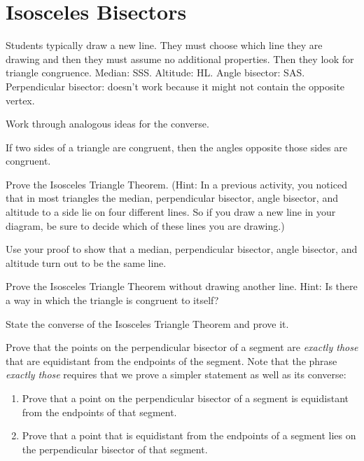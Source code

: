 \newpage

\section{Isosceles Bisectors}

\begin{teachingnote}
Students typically draw a new line. They must choose which line they are drawing and then they must assume no additional properties.  Then they look for triangle congruence.  Median: SSS.  Altitude: HL.  Angle bisector: SAS. Perpendicular bisector: doesn't work because it might not contain the opposite vertex.  

Work through analogous ideas for the converse. 
\end{teachingnote}

\begin{theorem}
If two sides of a triangle are congruent, then the angles opposite those sides are congruent. 
\end{theorem}

\begin{prob}
Prove the Isosceles Triangle Theorem.  (Hint: In a previous activity, you noticed that in most triangles the median, perpendicular bisector, angle bisector, and altitude to a side lie on four different lines.  So if you draw a new line in your diagram, be sure to decide which of these lines you are drawing.)
\end{prob}
\vfill

\begin{prob}
Use your proof to show that a median, perpendicular bisector, angle bisector, and altitude turn out to be the same line.
\end{prob}
\vfill
\newpage

\begin{prob}
Prove the Isosceles Triangle Theorem without drawing another line.  Hint:  Is there a way in which the triangle is congruent to itself? 
\end{prob}
\vfill

\begin{prob}
State the converse of the Isosceles Triangle Theorem and prove it.  
\end{prob}
\vfill
\newpage
\begin{prob}
Prove that the points on the perpendicular bisector of a segment are \emph{exactly those} that are equidistant from the endpoints of the segment.  Note that the phrase \emph{exactly those} requires that we prove a simpler statement as well as its converse:   
\begin{enumerate}
\item Prove that a point on the perpendicular bisector of a segment is equidistant from the endpoints of that segment.
\item Prove that a point that is equidistant from the endpoints of a segment lies on the perpendicular bisector of that segment.
\end{enumerate}
\end{prob}

